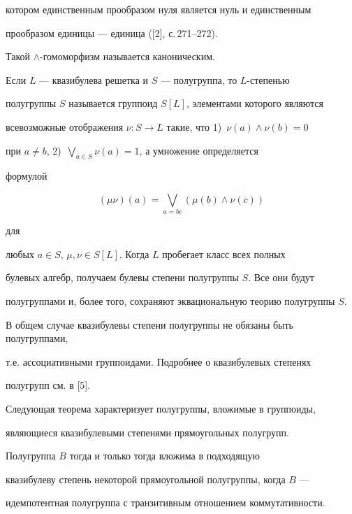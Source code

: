 котором единственным прообразом нуля является нуль и единственным


прообразом единицы --- единица ([2], с.\,271--272).


Такой $\wedge$-гомоморфизм называется каноническим.





Если $L$ --- квазибулева решетка и $S$ --- полугруппа, то $L$-степенью


полугруппы $S$ называется группоид $S[L]$, элементами которого являются


всевозможные отображения $\nu: S\to L$ такие, что 1)~$\nu(a)\wedge\nu(b)=0$


при $a\ne b$, 2)~$\bigvee_{a\in S} \nu(a)=1$, а умножение определяется


формулой


$$


(\mu\nu)(a)=\bigvee_{a=bc}(\mu(b)\wedge\nu(c))


$$


для


любых $a\in S$, $\mu,\nu\in S[L]$. Когда $L$ пробегает класс всех полных


булевых алгебр, получаем булевы степени полугруппы $S$. Все они будут


полугруппами и, более того, сохраняют эквациональную теорию полугруппы $S$.


В общем случае квазибулевы степени полугруппы не обязаны быть полугруппами,


т.е. ассоциативными группоидами. Подробнее о квазибулевых степенях


полугрупп см. в [5].





Следующая теорема характеризует полугруппы, вложимые в группоиды,


являющиеся квазибулевыми степенями прямоугольных полугрупп.





\begin{thm}


Полугруппа $B$ тогда и только тогда вложима в подходящую


квазибулеву степень некоторой прямоугольной полугруппы, когда $B$ ---


идемпотентная полугруппа с транзитивным отношением коммутативности.


\end{thm}






